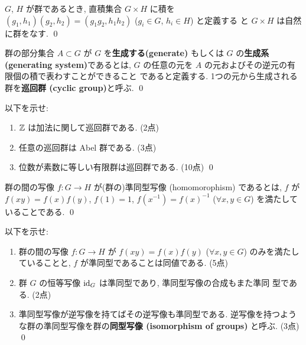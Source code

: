 \documentclass[12pt,twoside]{jarticle}
\begin{document}

\begin{question}[群の直積, 5点]
  $G$, $H$ が群であるとき, 直積集合 $G\times H$ に積を %
  $(g_1,h_1)(g_2,h_2) = (g_1g_2,h_1h_2)$ ($g_i\in G$, $h_i\in H$) と定義する
  と $G\times H$ は自然に群をなす.
  \qed
\end{question}


\begin{definition}
群の部分集合 $A\subset G$ が $G$ を{\bf 生成する(generate)} もしくは
$G$ の{\bf 生成系 (generating system)}であるとは, 
$G$ の任意の元を $A$ の元およびその逆元の有限個の積で表わすことができること
であると定義する. 1つの元から生成される群を{\bf 巡回群 (cyclic group)}と呼ぶ.
\qed
\end{definition}


\begin{question}[巡回群]
  以下を示せ:
  \begin{enumerate}
  \item ${\mathbb Z}$ は加法に関して巡回群である. (2点)
  \item 任意の巡回群は Abel 群である. (3点)
  \item 位数が素数に等しい有限群は巡回群である. (10点)
    \qed
  \end{enumerate}
\end{question}


\begin{definition}
  群の間の写像 $f:G\to H$ が(群の)準同型写像 (homomorophism) であるとは, 
  $f$ が $f(xy) = f(x)f(y)$, $f(1)=1$, $f(x^{-1})=f(x)^{-1}$
  ($\forall x,y\in G$) を満たしていることである.
  \qed
\end{definition}


\begin{question}[群の準同型写像]
  以下を示せ:
  \begin{enumerate}
  \item 群の間の写像 $f:G\to H$ が $f(xy) = f(x)f(y)$ ($\forall x,y\in G$) 
    のみを満たしていることと, $f$ が準同型であることは同値である.
    (5点)
  \item 群 $G$ の恒等写像 $\mathop{\mathrm{id}}\nolimits_G$ は準同型であり, 準同型写像の合成もまた準同
    型である. (2点)
  \item 準同型写像が逆写像を持てばその逆写像も準同型である. 逆写像を持つよう
    な群の準同型写像を群の{\bf 同型写像 (isomorphism of groups)} と呼ぶ.
    (3点)
  \qed
  \end{enumerate}
\end{question}
\end{document}
